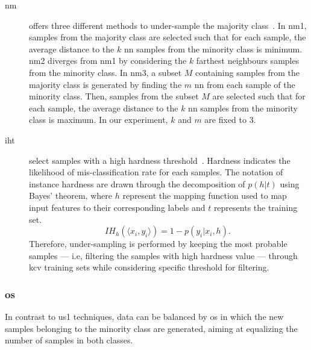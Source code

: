 \begin{description}
  \item[\Ac{nm}] offers three different methods to under-sample the majority class~\cite{mani2003knn}.
In \ac{nm1}, samples from the majority class are selected such that for each sample, the average distance to the $k$ \ac{nn} samples from the minority class is minimum.
\ac{nm2} diverges from \ac{nm1} by considering the $k$ farthest neighbours samples from the minority class.
In \ac{nm3}, a subset $M$ containing samples from the majority class is generated by finding the $m$ \ac{nn} from each sample of the minority class.
Then, samples from the subset $M$ are selected such that for each sample, the average distance to the $k$ \ac{nn} samples from the minority class is maximum.
In our experiment, $k$ and $m$ are fixed to 3.
\item[\Ac{iht}] select samples with a high hardness threshold~\cite{smith2014instance}.
Hardness indicates the likelihood of mis-classification rate for each samples.
The notation of instance hardness are drawn through the decomposition of $p(h \vert t)$ using Bayes' theorem, where $h$ represent the mapping function used to map input features to their corresponding labels and $t$ represents the training set.
\begin{equation}
  IH_h(\langle x_{i}, y_{i}\rangle) = 1 - p(y_i \vert x_i, h).\
\label{eq:iht}
\end{equation}
Therefore, under-sampling is performed by keeping the most probable samples --- i.e, filtering the samples with high hardness value --- through \ac{kcv} training sets while considering specific threshold for filtering.

 
\end{description}

\subsubsection{\Acl*{os}}
In contrast to \ac{us1} techniques, data can be balanced by \ac{os} in which the new samples belonging to the minority class are generated, aiming at equalizing the number of samples in both classes.

